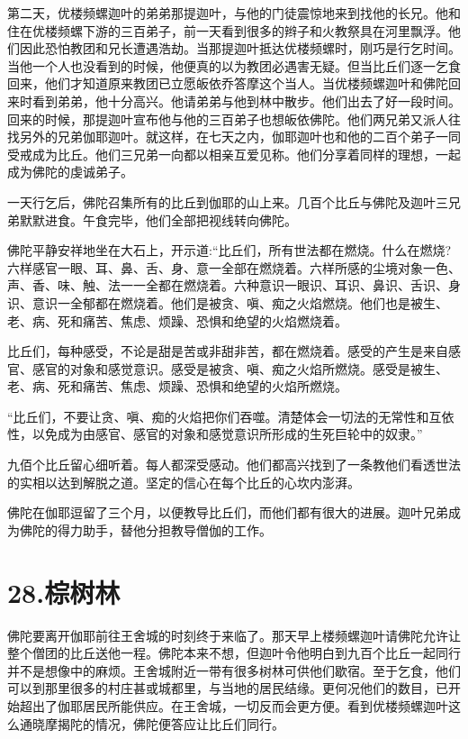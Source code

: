 \documentclass[12pt,twoside,openany]{book}
\begin{document}
第二天，优楼频螺迦叶的弟弟那提迦叶，与他的门徒震惊地来到找他的长兄。他和住在优楼频螺下游的三百弟子，前一天看到很多的辫子和火教祭具在河里飘浮。他们因此恐怕教团和兄长遭遇浩劫。当那提迦叶抵达优楼频螺时，刚巧是行乞时间。当他一个人也没看到的时候，他便真的以为教团必遇害无疑。但当比丘们逐一乞食回来，他们才知道原来教团已立愿皈依乔答摩这个当人。当优楼频螺迦叶和佛陀回来时看到弟弟，他十分高兴。他请弟弟与他到林中散步。他们出去了好一段时间。回来的时候，那提迦叶宣布他与他的三百弟子也想皈依佛陀。他们两兄弟又派人往找另外的兄弟伽耶迦叶。就这样，在七天之内，伽耶迦叶也和他的二百个弟子一同受戒成为比丘。他们三兄弟一向都以相亲互爱见称。他们分享着同样的理想，一起成为佛陀的虔诚弟子。

一天行乞后，佛陀召集所有的比丘到伽耶的山上来。几百个比丘与佛陀及迦叶三兄弟默默进食。午食完毕，他们全部把视线转向佛陀。

佛陀平静安祥地坐在大石上，开示道:“比丘们，所有世法都在燃烧。什么在燃烧?六样感官一眼、耳、鼻、舌、身、意一全部在燃烧着。六样所感的尘境对象一色、声、香、味、触、法一一全都在燃烧着。六种意识一眼识、耳识、鼻识、舌识、身识、意识一全郁都在燃烧着。他们是被贪、嗔、痴之火焰燃烧。他们也是被生、老、病、死和痛苦、焦虑、烦躁、恐惧和绝望的火焰燃烧着。

比丘们，每种感受，不论是甜是苦或非甜非苦，都在燃烧着。感受的产生是来自感官、感官的对象和感觉意识。感受是被贪、嗔、痴之火焰所燃烧。感受是被生、老、病、死和痛苦、焦虑、烦躁、恐惧和绝望的火焰所燃烧。

“比丘们，不要让贪、嗔、痴的火焰把你们吞噬。清楚体会一切法的无常性和互依性，以免成为由感官、感官的对象和感觉意识所形成的生死巨轮中的奴隶。”

九佰个比丘留心细听着。每人都深受感动。他们都高兴找到了一条教他们看透世法的实相以达到解脱之道。坚定的信心在每个比丘的心坎内澎湃。

佛陀在伽耶逗留了三个月，以便教导比丘们，而他们都有很大的进展。迦叶兄弟成为佛陀的得力助手，替他分担教导僧伽的工作。


\chapter{28.棕树林}\label{ch28}

佛陀要离开伽耶前往王舍城的时刻终于来临了。那天早上楼频螺迦叶请佛陀允许让整个僧团的比丘送他一程。佛陀本来不想，但迦叶令他明白到九百个比丘一起同行并不是想像中的麻烦。王舍城附近一带有很多树林可供他们歇宿。至于乞食，他们可以到那里很多的村庄甚或城都里，与当地的居民结缘。更何况他们的数目，已开始超出了伽耶居民所能供应。在王舍城，一切反而会更方便。看到优楼频螺迦叶这么通晓摩揭陀的情况，佛陀便答应让比丘们同行。
\end{document}
